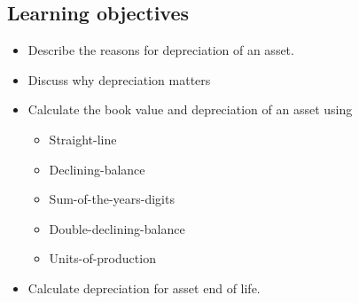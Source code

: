 \subsection{Learning objectives}
\begin{summary}
    \begin{itemize}
        \item Describe the reasons for depreciation of an asset.
        \item Discuss why depreciation matters
        \item Calculate the book value and depreciation of an asset using 
        \begin{itemize}
            \item Straight-line
            \item Declining-balance
            \item Sum-of-the-years-digits
            \item Double-declining-balance
            \item Units-of-production
        \end{itemize}
        \item Calculate depreciation for asset end of life. 
    \end{itemize}
\end{summary}

